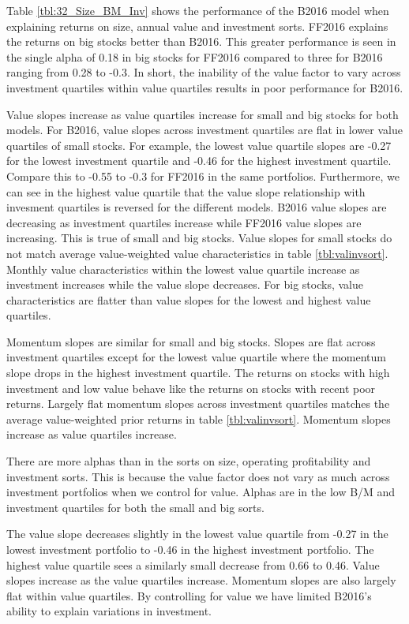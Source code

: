 Table \ref{tbl:32_Size_BM_Inv} shows the performance of the B2016 model when explaining
returns on size, annual value and investment sorts. FF2016 explains the returns on big
stocks better than B2016. This greater performance is seen in the single alpha of 0.18 in
big stocks for FF2016 compared to three for B2016 ranging from 0.28 to -0.3. In short, the
inability of the value factor to vary across investment quartiles within value quartiles
results in poor performance for B2016.

Value slopes increase as value quartiles increase for small and big stocks for both
models. For B2016, value slopes across investment quartiles are flat in lower value
quartiles of small stocks. For example, the lowest value quartile slopes are -0.27 for the
lowest investment quartile and -0.46 for the highest investment quartile. Compare this to
-0.55 to -0.3 for FF2016 in the same portfolios. Furthermore, we can see in the highest
value quartile that the value slope relationship with invesment quartiles is reversed for
the different models. B2016 value slopes are decreasing as investment quartiles increase
while FF2016 value slopes are increasing. This is true of small and big stocks. Value
slopes for small stocks do not match average value-weighted value characteristics in table
\ref{tbl:valinvsort}. Monthly value characteristics within the lowest value quartile
increase as investment increases while the value slope decreases. For big stocks, value
characteristics are flatter than value slopes for the lowest and highest value quartiles.

Momentum slopes are similar for small and big stocks. Slopes are flat across investment
quartiles except for the lowest value quartile where the momentum slope drops in the
highest investment quartile. The returns on stocks with high investment and low value
behave like the returns on stocks with recent poor returns. Largely flat momentum slopes
across investment quartiles matches the average value-weighted prior returns in table
\ref{tbl:valinvsort}. Momentum slopes increase as value quartiles increase.

There are more alphas than in the
sorts on size, operating profitability and investment sorts. This is because the value
factor does not vary as much across investment portfolios when we control for value.
Alphas are in the low B/M and investment quartiles for both the small and big sorts.

The value slope decreases slightly in the lowest value quartile from -0.27 in the lowest
investment portfolio to -0.46 in the highest investment portfolio. The highest value
quartile sees a similarly small decrease from 0.66 to 0.46. Value slopes increase as the
value quartiles increase. Momentum slopes are also largely flat within value quartiles. By
controlling for value we have limited B2016's ability to explain variations in investment.

\restoregeometry
